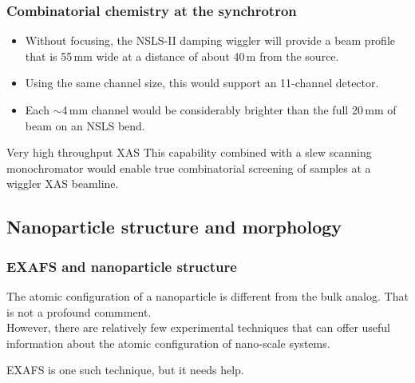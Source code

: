 \documentclass[10pt, xcolor=x11names, compress, handout]{beamer}
\begin{document}
\begin{frame}
  \frametitle{Combinatorial chemistry at the synchrotron}
  \begin{itemize}
  \item Without focusing, the NSLS-II damping wiggler will provide a
    beam profile that is 55\,mm wide at a distance of about 40\,m from
    the source.
  \item Using the same channel size, this would support an 11-channel
    detector.
  \item Each $\sim$4\,mm channel would be considerably brighter than
    the full 20\,mm of beam on an NSLS bend.
  \end{itemize}

  \bigskip

  \begin{alertblock}{Very high throughput XAS}
    This capability combined with a slew scanning monochromator would
    enable true combinatorial screening of samples at a wiggler XAS
    beamline. 
  \end{alertblock}
\end{frame}

\subsection[Nanoparticle]{Nanoparticle structure and morphology}

\begin{frame}
  \frametitle{EXAFS and nanoparticle structure}
  
  \begin{exampleblock}{The atomic configuration of a nanoparticle is
      different from the bulk analog.}
    That is not a profound commment.\\[1ex] However, there are
    relatively few experimental techniques that can offer useful
    information about the atomic configuration of nano-scale systems.
  \end{exampleblock}

  \begin{center}
    EXAFS is one such technique, but it needs help.
  \end{center}

\end{frame}
\end{document}
